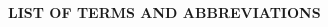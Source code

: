 \documentclass[12pt,oneside,a4paper,semicolon]{book} %
\begin{document}


\newpage
\begin{spacing}{1.5}


\newpage

\newpage
{}

\newpage

\end{spacing}
\newpage
\begin{spacing}{1.5}
	\tableofcontents	
\end{spacing}
\newpage
\let\origaddvspace\addvspace
\renewcommand{\addvspace}[1]{}
\begin{spacing}{1.5}
	\setcounter{lofdepth}{2} \listoffigures
\end{spacing}
\newpage
\begin{spacing}{1.5}
	\setcounter{lotdepth}{2} \listoftables 	
\end{spacing}

\clearpage


\begin{center}
    \textbf{LIST OF TERMS AND ABBREVIATIONS}
\end{center}
\vspace{0.5cm}

\printglossary%

\mainmatter


\begin{spacing}{1.5}
	















\end{spacing}
%
% 

\newpage 
\begin{spacing}{1.5}

\end{spacing}


	\begin{appendices}
		\appendixpage
		\noappendicestocpagenum
		\addappheadtotoc
		
	\end{appendices}
\end{document}
